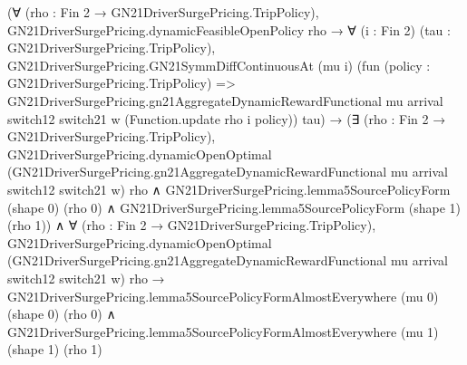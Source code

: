 \documentclass[10pt]{article}
\begin{document}
\begin{ReviewVerbatim}
                            (∀ (rho : Fin 2 → GN21DriverSurgePricing.TripPolicy),
                                GN21DriverSurgePricing.dynamicFeasibleOpenPolicy rho →
                                  ∀ (i : Fin 2) (tau : GN21DriverSurgePricing.TripPolicy),
                                    GN21DriverSurgePricing.GN21SymmDiffContinuousAt (mu i)
                                      (fun (policy : GN21DriverSurgePricing.TripPolicy) =>
                                        GN21DriverSurgePricing.gn21AggregateDynamicRewardFunctional mu arrival switch12
                                          switch21 w (Function.update rho i policy))
                                      tau) →
                              (∃ (rho : Fin 2 → GN21DriverSurgePricing.TripPolicy),
                                  GN21DriverSurgePricing.dynamicOpenOptimal
                                      (GN21DriverSurgePricing.gn21AggregateDynamicRewardFunctional mu arrival switch12
                                        switch21 w)
                                      rho ∧
                                    GN21DriverSurgePricing.lemma5SourcePolicyForm (shape 0) (rho 0) ∧
                                      GN21DriverSurgePricing.lemma5SourcePolicyForm (shape 1) (rho 1)) ∧
                                ∀ (rho : Fin 2 → GN21DriverSurgePricing.TripPolicy),
                                  GN21DriverSurgePricing.dynamicOpenOptimal
                                      (GN21DriverSurgePricing.gn21AggregateDynamicRewardFunctional mu arrival switch12
                                        switch21 w)
                                      rho →
                                    GN21DriverSurgePricing.lemma5SourcePolicyFormAlmostEverywhere (mu 0) (shape 0)
                                        (rho 0) ∧
                                      GN21DriverSurgePricing.lemma5SourcePolicyFormAlmostEverywhere (mu 1) (shape 1)
                                        (rho 1)
\end{ReviewVerbatim}
\end{document}
